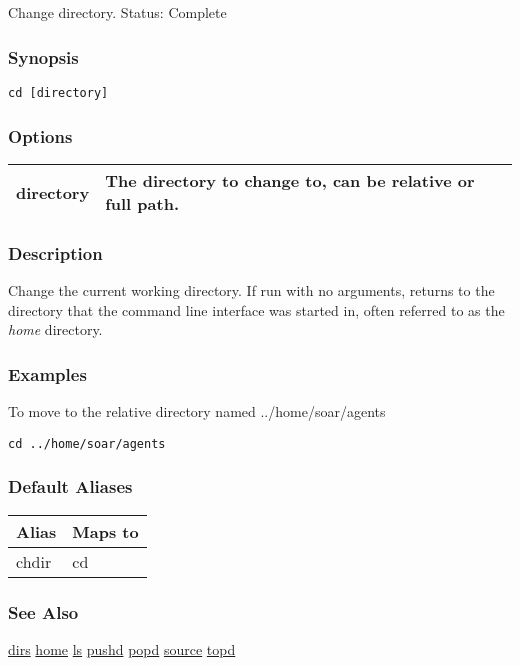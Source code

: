 \subsection{}
\label{cd}
Change directory. 
 Status: Complete
\subsubsection*{Synopsis}
\begin{verbatim}
cd [directory]
\end{verbatim}
\subsubsection*{Options}
\begin{tabular}{|l|l|}
\hline 
 directory  & The directory to change to, can be relative or full path.  \\
 \hline 
\end{tabular}
\subsubsection*{Description}
 Change the current working directory. If run with no arguments, returns to the directory that the command line interface was started in, often referred to as the \emph{home}
 directory. 
\subsubsection*{Examples}
 To move to the relative directory named ../home/soar/agents \begin{verbatim}
cd ../home/soar/agents
\end{verbatim}
\subsubsection*{Default Aliases}
\begin{tabular}{|l|l|}
\hline 
 Alias  & Maps to  \\
 \hline 
 chdir  & cd  \\
 \hline 
\end{tabular}
\subsubsection*{See Also}
\hyperref[dirs]{dirs} \hyperref[home]{home} \hyperref[ls]{ls} \hyperref[pushd]{pushd} \hyperref[popd]{popd} \hyperref[source]{source} \hyperref[topd]{topd} 